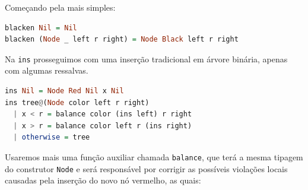 Começando pela mais simples:

\begin{lstlisting}[language=haskell]
blacken Nil = Nil
blacken (Node _ left r right) = Node Black left r right
\end{lstlisting}
\FloatBarrier

Na \texttt{ins} prosseguimos com uma inserção tradicional em árvore binária, apenas com algumas ressalvas.

\begin{lstlisting}[language=haskell]
ins Nil = Node Red Nil x Nil                 
ins tree@(Node color left r right)           
  | x < r = balance color (ins left) r right 
  | x > r = balance color left r (ins right) 
  | otherwise = tree                         
\end{lstlisting}
\FloatBarrier

Usaremos mais uma função auxiliar chamada \texttt{balance}, que terá a mesma tipagem do construtor \texttt{Node} e será responsável por corrigir as possíveis violações locais causadas pela inserção do novo nó vermelho, as quais:

